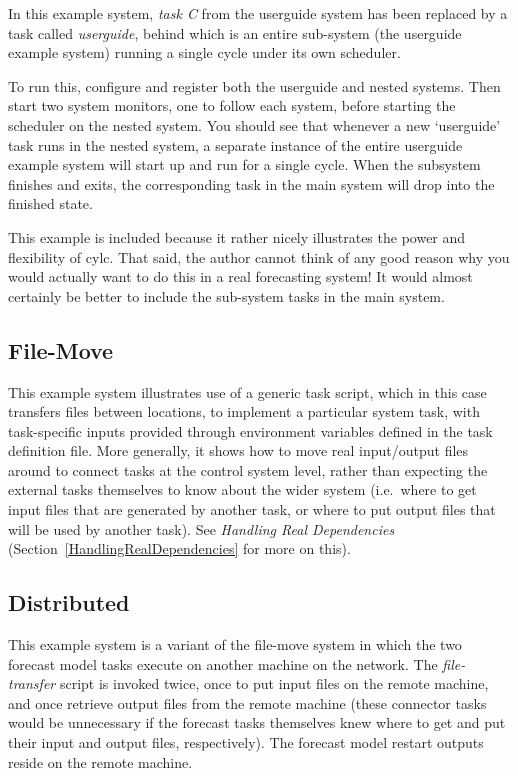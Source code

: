 \documentclass[11pt,a4paper]{article}
\begin{document}
In this example system, {\em task C} from the userguide system has been
replaced by a task called {\em userguide}, behind which is an entire
sub-system (the userguide example system) running a single cycle under
its own scheduler.

To run this, configure and register both the userguide and nested
systems. Then start two system monitors, one to follow each system,
before starting the scheduler on the nested system. You should see that 
whenever a new `userguide' task runs in the nested system, a separate
instance of the entire userguide example system will start up and run
for a single cycle. When the subsystem finishes and exits, the
corresponding task in the main system will drop into the finished state.

This example is included because it rather nicely illustrates the power
and flexibility of cylc. That said, the author cannot think of any good
reason why you would actually want to do this in a real forecasting
system! It would almost certainly be better to include the sub-system
tasks in the main system.

\subsection{File-Move}

This example system illustrates use of a generic task script, which in
this case transfers files between locations, to implement a particular
system task, with task-specific inputs provided through environment
variables defined in the task definition file.  More generally, it shows
how to move real input/output files around to connect tasks at the
control system level, rather than expecting the external tasks
themselves to know about the wider system (i.e.\ where to get input
files that are generated by another task, or where to put output files
that will be used by another task).  See {\em Handling Real
Dependencies} (Section~\ref{HandlingRealDependencies} for more
on this).

\subsection{Distributed}
\label{Distributed}

This example system is a variant of the file-move system in which the
two forecast model tasks execute on another machine on the network.  The
{\em file-transfer} script is invoked twice, once to put input files on
the remote machine, and once retrieve output files from the remote
machine (these connector tasks would be unnecessary if the forecast
tasks themselves knew where to get and put their input and output files,
respectively). The forecast model restart outputs reside on the remote
machine.
\end{document}
